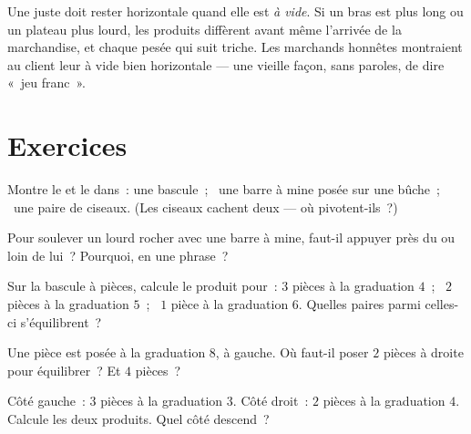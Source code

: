 \begin{remark}\label{rem:g3:levers-and-scales:fair}
Une  juste doit rester horizontale quand elle est \emph{à
vide}. Si un bras est plus long ou un plateau plus lourd, les
produits diffèrent avant même l'arrivée de la marchandise, et chaque
pesée qui suit triche. Les marchands honnêtes montraient au client
leur  à vide bien horizontale --- une vieille façon, sans
paroles, de dire «~jeu franc~».
\end{remark}

\section{Exercices}

\begin{exercise}[$\star$]\label{exo:g3:levers-and-scales:1}
Montre le  et le  dans~: une bascule~; \ une barre à mine
posée sur une bûche~; \ une paire de ciseaux. (Les ciseaux cachent
deux  --- où pivotent-ils~?)
\end{exercise}

\begin{exercise}[$\star$]\label{exo:g3:levers-and-scales:2}
Pour soulever un lourd rocher avec une barre à mine, faut-il appuyer
près du  ou loin de lui~? Pourquoi, en une phrase~?
\end{exercise}

\begin{exercise}[$\star$]\label{exo:g3:levers-and-scales:3}
Sur la bascule à pièces, calcule le produit pour~: $3$ pièces à la
graduation $4$~; \ $2$ pièces à la graduation $5$~; \ $1$ pièce à la
graduation $6$. Quelles paires parmi celles-ci s'équilibrent~?
\end{exercise}

\begin{exercise}[$\star$]\label{exo:g3:levers-and-scales:4}
Une pièce est posée à la graduation $8$, à gauche. Où faut-il poser
$2$ pièces à droite pour équilibrer~? Et $4$ pièces~?
\end{exercise}

\begin{exercise}[$\star$]\label{exo:g3:levers-and-scales:5}
Côté gauche~: $3$ pièces à la graduation $3$. Côté droit~: $2$ pièces
à la graduation $4$. Calcule les deux produits. Quel côté descend~?
\end{exercise}

